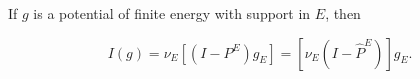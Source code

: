 If $g$ is a potential of finite energy with support in $E$, then

$$I(g) = \nu_E[(I - P^E)g_E] = [\nu_E(I - \hat{P}^E)]g_E.$$
